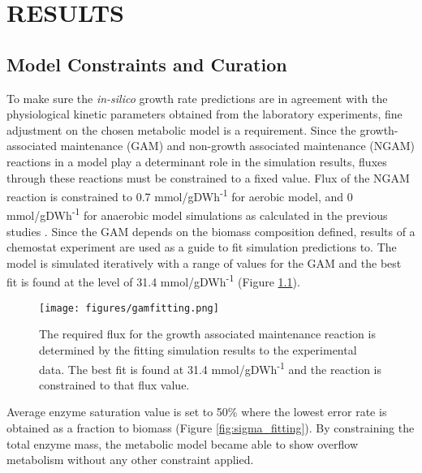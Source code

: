 \chapter{RESULTS}

\section{Model Constraints and Curation}


To make sure the \emph{in-silico} growth rate predictions are in agreement with the physiological kinetic parameters obtained from the laboratory experiments, fine adjustment on the chosen metabolic model is a requirement. Since the growth-associated maintenance (GAM) and non-growth associated maintenance (NGAM) reactions in a model play a determinant role in the simulation results, fluxes through these reactions must be constrained to a fixed value. Flux of the NGAM reaction is constrained to 0.7 mmol/gDWh\textsuperscript{-1} for aerobic model, and 0 mmol/gDWh\textsuperscript{-1} for anaerobic model simulations as calculated in the previous studies \cite{nilsson2016metabolic}. Since the GAM depends on the biomass composition defined, results of a chemostat experiment \cite{van1998effect} are used as a guide to fit simulation predictions to. The model is simulated iteratively with a range of values for the GAM and the best fit is found at the level of 31.4 mmol/gDWh\textsuperscript{-1} (Figure \ref{fig:gam_fitting}).

\begin{figure}[H]
  \begin{center}
      \texttt{[image: figures/gamfitting.png]}
      \caption[The required flux for the growth associated maintenance reaction is determined by the fitting simulation results to the experimental data]{The required flux for the growth associated maintenance reaction is determined by the fitting simulation results to the experimental data. The best fit is found at 31.4 mmol/gDWh\textsuperscript{-1} and the reaction is constrained to that flux value.}
      \label{fig:gam_fitting}
  \end{center}
\end{figure}

Average enzyme saturation value is set to 50\% where the lowest error rate is obtained as a fraction to biomass (Figure \ref{fig:sigma_fitting}). By constraining the total enzyme mass, the metabolic model became able to show overflow metabolism without any other constraint applied.

